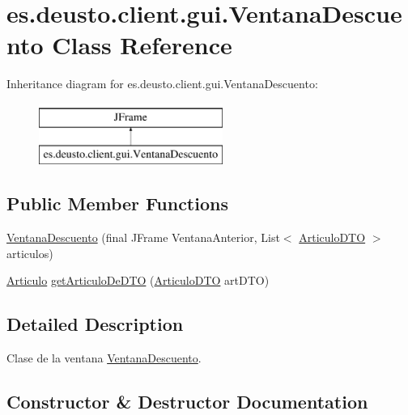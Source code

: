 \hypertarget{classes_1_1deusto_1_1client_1_1gui_1_1_ventana_descuento}{}\section{es.\+deusto.\+client.\+gui.\+Ventana\+Descuento Class Reference}
\label{classes_1_1deusto_1_1client_1_1gui_1_1_ventana_descuento}
Inheritance diagram for es.\+deusto.\+client.\+gui.\+Ventana\+Descuento\+:\begin{figure}[H]
\begin{center}
\leavevmode
\includegraphics[height=2.000000cm]{classes_1_1deusto_1_1client_1_1gui_1_1_ventana_descuento}
\end{center}
\end{figure}
\subsection*{Public Member Functions}
\begin{DoxyCompactItemize}
\item 
\mbox{\hyperlink{classes_1_1deusto_1_1client_1_1gui_1_1_ventana_descuento_a2bb7545dd5900527e55d52abccb3202c}{Ventana\+Descuento}} (final J\+Frame Ventana\+Anterior, List$<$ \mbox{\hyperlink{classes_1_1deusto_1_1server_1_1dto_1_1_articulo_d_t_o}{Articulo\+D\+TO}} $>$ articulos)
\item 
\mbox{\hyperlink{classes_1_1deusto_1_1client_1_1data_1_1_articulo}{Articulo}} \mbox{\hyperlink{classes_1_1deusto_1_1client_1_1gui_1_1_ventana_descuento_a9c176013a8dcfac308ca22d37aafe4d2}{get\+Articulo\+De\+D\+TO}} (\mbox{\hyperlink{classes_1_1deusto_1_1server_1_1dto_1_1_articulo_d_t_o}{Articulo\+D\+TO}} art\+D\+TO)
\end{DoxyCompactItemize}


\subsection{Detailed Description}
Clase de la ventana \mbox{\hyperlink{classes_1_1deusto_1_1client_1_1gui_1_1_ventana_descuento}{Ventana\+Descuento}}. 

\subsection{Constructor \& Destructor Documentation}
\mbox{\label{classes_1_1deusto_1_1client_1_1gui_1_1_ventana_descuento_a2bb7545dd5900527e55d52abccb3202c}} 
